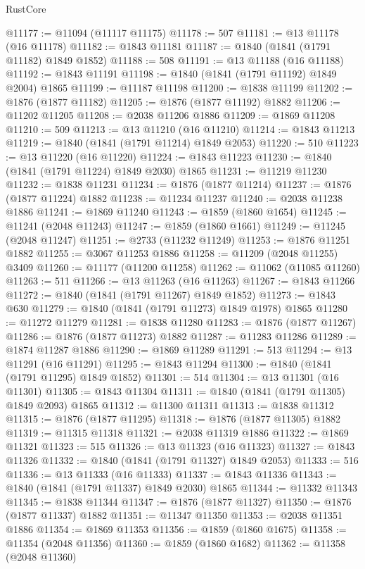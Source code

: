 \begin{lexlean}{RustCore}
\begin{coremodule}
@11177 := @11094 (@11117 @11175)
@11178 := 507
@11181 := @13 @11178 (@16 @11178)
@11182 := @1843 @11181
@11187 := @1840 (@1841 (@1791 @11182) @1849 @1852)
@11188 := 508
@11191 := @13 @11188 (@16 @11188)
@11192 := @1843 @11191
@11198 := @1840 (@1841 (@1791 @11192) @1849 @2004) @1865
@11199 := @11187 @11198
@11200 := @1838 @11199
@11202 := @1876 (@1877 @11182)
@11205 := @1876 (@1877 @11192) @1882
@11206 := @11202 @11205
@11208 := @2038 @11206 @1886
@11209 := @1869 @11208
@11210 := 509
@11213 := @13 @11210 (@16 @11210)
@11214 := @1843 @11213
@11219 := @1840 (@1841 (@1791 @11214) @1849 @2053)
@11220 := 510
@11223 := @13 @11220 (@16 @11220)
@11224 := @1843 @11223
@11230 := @1840 (@1841 (@1791 @11224) @1849 @2030) @1865
@11231 := @11219 @11230
@11232 := @1838 @11231
@11234 := @1876 (@1877 @11214)
@11237 := @1876 (@1877 @11224) @1882
@11238 := @11234 @11237
@11240 := @2038 @11238 @1886
@11241 := @1869 @11240
@11243 := @1859 (@1860 @1654)
@11245 := @11241 (@2048 @11243)
@11247 := @1859 (@1860 @1661)
@11249 := @11245 (@2048 @11247)
@11251 := @2733 (@11232 @11249)
@11253 := @1876 @11251 @1882
@11255 := @3067 @11253 @1886
@11258 := @11209 (@2048 @11255) @3409
@11260 := @11177 (@11200 @11258)
@11262 := @11062 (@11085 @11260)
@11263 := 511
@11266 := @13 @11263 (@16 @11263)
@11267 := @1843 @11266
@11272 := @1840 (@1841 (@1791 @11267) @1849 @1852)
@11273 := @1843 @630
@11279 := @1840 (@1841 (@1791 @11273) @1849 @1978) @1865
@11280 := @11272 @11279
@11281 := @1838 @11280
@11283 := @1876 (@1877 @11267)
@11286 := @1876 (@1877 @11273) @1882
@11287 := @11283 @11286
@11289 := @1874 @11287 @1886
@11290 := @1869 @11289
@11291 := 513
@11294 := @13 @11291 (@16 @11291)
@11295 := @1843 @11294
@11300 := @1840 (@1841 (@1791 @11295) @1849 @1852)
@11301 := 514
@11304 := @13 @11301 (@16 @11301)
@11305 := @1843 @11304
@11311 := @1840 (@1841 (@1791 @11305) @1849 @2093) @1865
@11312 := @11300 @11311
@11313 := @1838 @11312
@11315 := @1876 (@1877 @11295)
@11318 := @1876 (@1877 @11305) @1882
@11319 := @11315 @11318
@11321 := @2038 @11319 @1886
@11322 := @1869 @11321
@11323 := 515
@11326 := @13 @11323 (@16 @11323)
@11327 := @1843 @11326
@11332 := @1840 (@1841 (@1791 @11327) @1849 @2053)
@11333 := 516
@11336 := @13 @11333 (@16 @11333)
@11337 := @1843 @11336
@11343 := @1840 (@1841 (@1791 @11337) @1849 @2030) @1865
@11344 := @11332 @11343
@11345 := @1838 @11344
@11347 := @1876 (@1877 @11327)
@11350 := @1876 (@1877 @11337) @1882
@11351 := @11347 @11350
@11353 := @2038 @11351 @1886
@11354 := @1869 @11353
@11356 := @1859 (@1860 @1675)
@11358 := @11354 (@2048 @11356)
@11360 := @1859 (@1860 @1682)
@11362 := @11358 (@2048 @11360)

\end{coremodule}
\end{lexlean}
